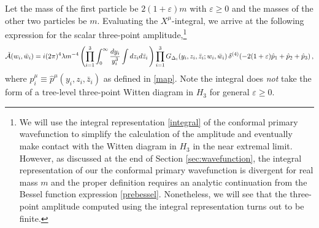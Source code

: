 \documentclass[12pt]{article}
\numberwithin{equation}{section}
\def\e{{\varepsilon}}
\begin{document}
Let the mass of the first particle be $2(1+\e) m$ with $\e\ge 0$ and the masses of the other two particles be $m$.  Evaluating the $X^\mu$-integral, we arrive at the following expression for the scalar three-point amplitude,\footnote{We will use the integral representation \eqref{integral} of the conformal primary wavefunction to simplify the calculation of the amplitude and eventually make contact with the Witten diagram in $H_3$ in the near extremal limit. However, as discussed at the end of Section \ref{sec:wavefunction}, the integral representation  of our the conformal primary wavefunction is divergent for real mass $m$ and the proper definition requires an analytic continuation from the Bessel function expression \eqref{prebessel}. Nonetheless, we will see that the three-point amplitude computed using the integral representation  turns out to be finite.} 
\begin{align}
\mathcal{ \tilde A}(w_i,\bar w_i) =i(2\pi)^4 \lambda m^{-4}
\left( \prod_{i=1}^3 \int_0^\infty   {dy_i \over y_i^3} \int dz_id\bar z_i \, \right)
\prod_{i=1}^3 G_{\Delta_i} (y_i , z_i,\bar z_i ;  w_i,\bar w_i)\,
\delta^{(4)}(-2(1+\e) \hat p_1 +\hat p_2+\hat p_3)\,,
\end{align}
where $\hat p_i^\mu \equiv  \hat p^\mu (y_i , z_i,\bar z_i)$ as defined in \eqref{map}.  Note the integral does \textit{not} take the form of a tree-level three-point Witten diagram in $H_3$ for general $\e\ge0$.
\end{document}
